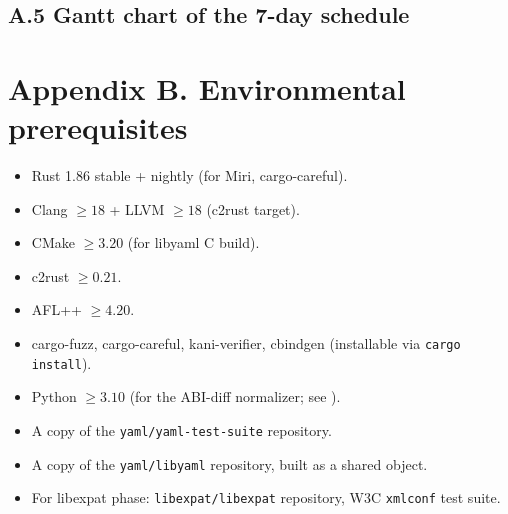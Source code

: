 \documentclass[12pt]{article}
\theoremstyle{definition}
\theoremstyle{remark}
\begin{document}
\subsection*{A.5 Gantt chart of the 7-day schedule}

\begin{center}
\end{center}

{}
\label{app:env}
\section*{Appendix B. Environmental prerequisites}

\begin{itemize}
\item Rust 1.86 stable + nightly (for Miri, cargo-careful).
\item Clang $\ge 18$ + LLVM $\ge 18$ (c2rust target).
\item CMake $\ge 3.20$ (for libyaml C build).
\item c2rust $\ge 0.21$.
\item AFL++ $\ge 4.20$.
\item cargo-fuzz, cargo-careful, kani-verifier, cbindgen
(installable via \texttt{cargo install}).
\item Python $\ge 3.10$ (for the ABI-diff normalizer; see
).
\item A copy of the \texttt{yaml/yaml-test-suite} repository.
\item A copy of the \texttt{yaml/libyaml} repository, built as a shared
object.
\item For libexpat phase: \texttt{libexpat/libexpat} repository,
W3C \texttt{xmlconf} test suite.
\end{itemize}
\end{document}
